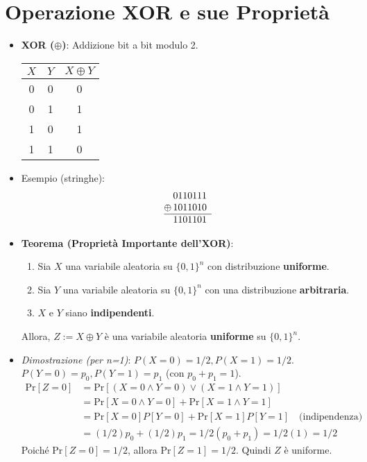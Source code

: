 \section{Operazione XOR e sue Proprietà}
\begin{itemize}
    \item \textbf{XOR ($\oplus$)}: Addizione bit a bit modulo 2.
    \begin{center}
    \begin{tabular}{cc|c}
        $X$ & $Y$ & $X \oplus Y$ \\ \hline
        0 & 0 & 0 \\
        0 & 1 & 1 \\
        1 & 0 & 1 \\
        1 & 1 & 0
    \end{tabular}
    \end{center}
    \item Esempio (stringhe):
    \[
    \begin{array}{@{}c@{\,}c@{}c@{}c@{}c@{}c@{}c@{}c}
      & 0 & 1 & 1 & 0 & 1 & 1 & 1 \\
    \oplus & 1 & 0 & 1 & 1 & 0 & 1 & 0 \\ \hline
      & 1 & 1 & 0 & 1 & 1 & 0 & 1
    \end{array}
    \]
    \item \textbf{Teorema (Proprietà Importante dell'XOR)}:
    \begin{enumerate}
        \item Sia $X$ una variabile aleatoria su $\{0,1\}^n$ con distribuzione \textbf{uniforme}.
        \item Sia $Y$ una variabile aleatoria su $\{0,1\}^n$ con una distribuzione \textbf{arbitraria}.
        \item $X$ e $Y$ siano \textbf{indipendenti}.
    \end{enumerate}
    Allora, $Z := X \oplus Y$ è una variabile aleatoria \textbf{uniforme} su $\{0,1\}^n$.
    \item \textit{Dimostrazione (per n=1)}:
        $P(X=0)=1/2, P(X=1)=1/2$. $P(Y=0)=p_0, P(Y=1)=p_1$ (con $p_0+p_1=1$).
        \begin{align*} \text{Pr}[Z=0] &= \text{Pr}[(X=0 \land Y=0) \lor (X=1 \land Y=1)] \\ &= \text{Pr}[X=0 \land Y=0] + \text{Pr}[X=1 \land Y=1] \\ &= \text{Pr}[X=0]P[Y=0] + \text{Pr}[X=1]P[Y=1] \quad \text{(indipendenza)} \\ &= (1/2)p_0 + (1/2)p_1 = 1/2(p_0+p_1) = 1/2(1) = 1/2 \end{align*}
        Poiché $\text{Pr}[Z=0]=1/2$, allora $\text{Pr}[Z=1]=1/2$. Quindi $Z$ è uniforme.
\end{itemize}


